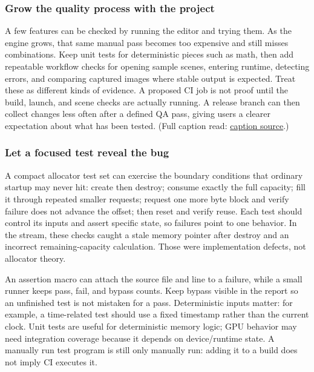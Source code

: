 \subsubsection{Grow the quality process with the project}\label{06-engine-ii-ch041-grow-the-quality-process-with-the-project}

A few features can be checked by running the editor and trying them. As the engine grows, that same manual pass becomes too expensive and still misses combinations. Keep unit tests for deterministic pieces such as math, then add repeatable workflow checks for opening sample scenes, entering runtime, detecting errors, and comparing captured images where stable output is expected. Treat these as different kinds of evidence. A proposed CI job is not proof until the build, launch, and scene checks are actually running. A release branch can then collect changes less often after a defined QA pass, giving users a clearer expectation about what has been tested. (Full caption read: \href{https://www.youtube.com/watch?v=tHjJHmDxhug}{caption source}.)

\subsubsection{Let a focused test reveal the bug}\label{06-engine-ii-ch041-let-a-focused-test-reveal-the-bug}

A compact allocator test set can exercise the boundary conditions that ordinary startup may never hit: create then destroy; consume exactly the full capacity; fill it through repeated smaller requests; request one more byte block and verify failure does not advance the offset; then reset and verify reuse. Each test should control its inputs and assert specific state, so failures point to one behavior. In the stream, these checks caught a stale memory pointer after destroy and an incorrect remaining-capacity calculation. Those were implementation defects, not allocator theory.

An assertion macro can attach the source file and line to a failure, while a small runner keeps pass, fail, and bypass counts. Keep bypass visible in the report so an unfinished test is not mistaken for a pass. Deterministic inputs matter: for example, a time-related test should use a fixed timestamp rather than the current clock. Unit tests are useful for deterministic memory logic; GPU behavior may need integration coverage because it depends on device/runtime state. A manually run test program is still only manually run: adding it to a build does not imply CI executes it.

